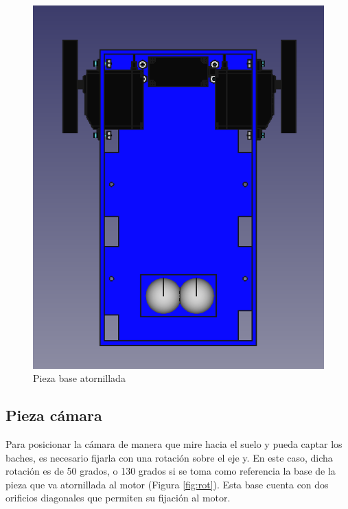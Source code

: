 \begin{figure}[ht!]
\begin{minipage}{0.45\linewidth}
		\includegraphics[width=\linewidth]{figs/cap5/basecon2.png}
		\caption*{\centering}
	\end{minipage}
	\caption{Pieza base atornillada}
	\label{fig:pbasemontada}
\end{figure}

\subsection{Pieza cámara}

 
Para posicionar la cámara de manera que mire hacia el suelo y pueda captar los baches, es necesario fijarla con una rotación sobre el eje y. En este caso, dicha rotación es de 50 grados, o 130 grados si se toma como referencia la base de la pieza que va atornillada al motor (Figura \ref{fig:rot}). Esta base cuenta con dos orificios diagonales que permiten su fijación al motor.

